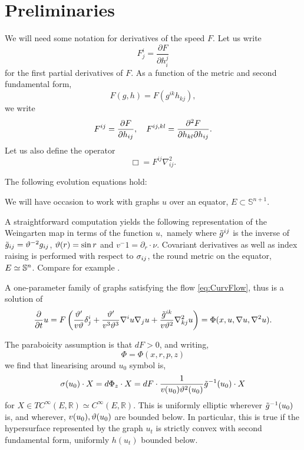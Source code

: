 \documentclass{amsart}
\begin{document}
\section{Preliminaries}
\label{sec:prelim}

We will need some notation for derivatives of the speed \(F\). Let us write
\[
F^{i}_{j} = \frac{\partial F}{\partial h^{j}_{i}}
\]
for the first partial derivatives of \(F\). As a function of the metric and second fundamental form,
\[
F(g, h) = F(g^{ik} h_{kj}),
\]
we write
\[
F^{ij} = \frac{\partial F}{\partial h_{ij}}, \quad F^{ij,kl} = \fr{\partial^2F}{\partial h_{kl} \partial h_{ij}}.
\]
Let us also define the operator
\[
\Box = F^{ij} \nabla^2_{ij}.
\]
\begin{lemma} \label{lem: basi ev}
The following evolution equations hold:
\end{lemma}

We will have occasion to work with graphs \(u\) over an equator, \(E \subset \mathbb{S}^{n+1}\).

A straightforward computation yields the following representation of the Weingarten map in terms of the function $u,$ namely
where $\~g^{ij}$ is the inverse of $\~g_{ij}=\vt^{-2}g_{ij}$, $\vt(r)=\sin r$ and \(v^-1 = \partial_r \cdot \nu\). Covariant derivatives as well as index raising is performed with respect to $\s_{ij}$, the round metric on the equator, \(E \simeq \S^n\). Compare for example \cite[(3.82)]{Scheuer:05/2015}.

A one-parameter family of graphs satisfying the flow \eqref{eq:CurvFlow}, thus is a solution of
\begin{equation}
\label{eq:GraphCurvFlow}
\fr{\del}{\del t}u=F\br{\fr{\vt'}{v\vt}\d^{i}_{j}+\fr{\vt'}{v^{3}\vt^{3}}\nabla^{i}u\nabla_{j}u+\fr{\~g^{ik}}{v\vt^{2}}\nabla^{2}_{kj}u}=\Phi(x,u,\nabla u,\nabla^{2}u).
\end{equation}

The paraboicity assumption is that \(dF > 0\), and writing,
\[
\Phi = \Phi(x, r, p, z)
\]
we find that linearising around \(u_0\) symbol is,
\[
\sigma(u_0) \cdot X = d\Phi_z \cdot X = dF \cdot \fr{1}{v(u_0) \vt^{2}(u_0)} \~g^{-1}(u_0) \cdot X
\]
for \(X \in TC^{\infty}(E, \mathbb{R}) \simeq C^{\infty}(E, \mathbb{R})\). This is uniformly elliptic wherever \(\~g^{-1}(u_0)\) is, and wherever, \(v(u_0), \vt(u_0)\) are bounded below. In particular, this is true if the hypersurface represented by the graph \(u_t\) is strictly convex with second fundamental form, uniformly \(h(u_t)\) bounded below.
\end{document}
